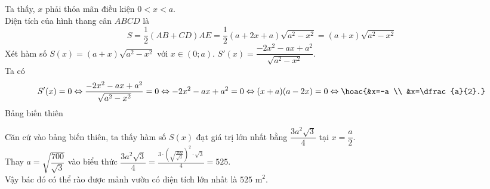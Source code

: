 \begin{bt}
{Ta thấy, $x$ phải thỏa mãn điều kiện $0<x<a$. \\
Diện tích của hình thang cân $A B C D$ là
$$
S=\dfrac{1}{2}(A B+C D) A E=\dfrac{1}{2}(a+2 x+a) \sqrt{a^2-x^2}=(a+x) \sqrt{a^2-x^2}
$$
Xét hàm số $S(x)=(a+x) \sqrt{a^2-x^2}$ với $x \in(0 ; a)$. $S'(x)=\dfrac{-2 x^2-a x+a^2}{\sqrt{a^2-x^2}}$. \\
Ta có 
$$S^{\prime}(x)=0 \Leftrightarrow \frac{-2 x^2-a x+a^2}{\sqrt{a^2-x^2}}=0 \Leftrightarrow-2 x^2-a x+a^2=0 \Leftrightarrow(x+a)(a-2 x)=0 \Leftrightarrow\hoac{&x=-a \\ &x=\dfrac{a}{2}.}$$
Bảng biến thiên
\begin{center}
\end{center}
Căn cứ vào bảng biến thiên, ta thấy hàm số $S(x)$ đạt giá trị lớn nhất bằng $\dfrac{3 a^2 \sqrt{3}}{4}$ tại $x=\dfrac{a}{2}$. \\
Thay $a=\sqrt{\dfrac{700}{\sqrt{3}}}$ vào biểu thức $\dfrac{3 a^2 \sqrt{3}}{4}=\tfrac{3 \cdot\left(\sqrt{\frac{700}{\sqrt{3}}}\right)^2 \cdot \sqrt{3}}{4}=525$.\\
Vậy bác đó có thể rào được mảnh vườn có diện tích lớn nhất là $525$ m$^2$.
}
\end{bt}

